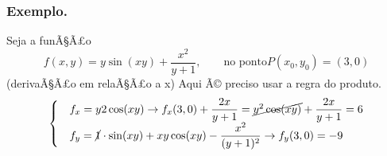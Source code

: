 \subsubsection{Exemplo.}
Seja a funÃ§Ã£o 
\[f(x,y)=y\sin(xy)+\frac{x^2}{y+1},\qquad\text{no ponto} P(x_0,y_0)=(3,0)\]
(derivaÃ§Ã£o em relaÃ§Ã£o a x)
Aqui Ã© preciso usar a regra do produto.
\[ \begin{cases}
  &f_x=y2\cos(xy)\to f_x(3,0)+\dfrac{2x}{y+1}=\cancel{y^2\cos(xy)}
  +\dfrac{2x}{y+1}=6\\
  &f_y=\cancel{1}\cdot\sin(xy)+xy\cos(xy)-\dfrac{x^2}{(y+1)^2}\to f_y(3,0)=-9

\end{cases} \]